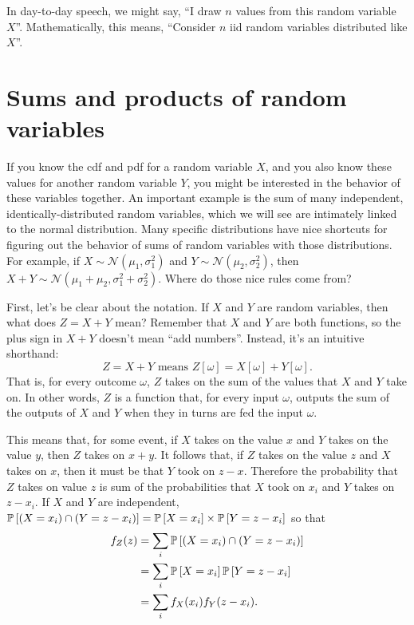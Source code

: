 In day-to-day speech, we might say, ``I draw $n$ values from this random
variable $X$''. Mathematically, this means, ``Consider $n$ iid random
variables distributed like $X$''.


\section{Sums and products of random variables}

If you know the cdf and pdf for a random variable $X$, and you also know these
values for another random variable $Y$, you might be interested in the
behavior of these variables together. An important example is the sum of many
independent, identically-distributed random variables, which we will see are
intimately linked to the normal distribution. Many specific distributions have
nice shortcuts for figuring out the behavior of sums of random variables with
those distributions. For example, if $X \sim \mathcal{N}(\mu_1, \sigma_1^2)$
and $Y \sim \mathcal{N}(\mu_2, \sigma_2^2)$, then $X + Y \sim
\mathcal{N}(\mu_1 + \mu_2, \sigma_1^2 + \sigma_2^2)$. Where do those nice
rules come from?

First, let's be clear about the notation. If $X$ and $Y$ are random variables,
then what does $Z = X + Y$ mean? Remember that $X$ and $Y$ are both functions,
so the plus sign in $X + Y$ doesn't mean ``add numbers''. Instead, it's an intuitive shorthand:
\begin{equation}
Z = X + Y \text{ means } Z[\omega] = X[\omega] + Y[\omega].
\end{equation}
That is, for every outcome $\omega$, $Z$ takes on the sum of the values that
$X$ and $Y$ take on. In other words, $Z$ is a function that, for every input
$\omega$, outputs the sum of the outputs of $X$ and $Y$ when they in turns are
fed the input $\omega$.

This means that, for some event, if $X$ takes on the value $x$ and $Y$ takes
on the value $y$, then $Z$ takes on $x+y$. It follows that, if
$Z$ takes on the value $z$ and $X$ takes on $x$, then it must be that $Y$
took on $z - x$. Therefore the probability that $Z$ takes on value $z$ is
sum of the probabilities that $X$ took on $x_i$ and $Y$ takes on $z - x_i$.
If $X$ and $Y$ are independent,
$\mathbb{P}\left[{(X = x_i) \cap (Y = z - x_i)}\right] = \mathbb{P}\left[{X = x_i}\right] \times \mathbb{P}\left[{Y = z - x_i}\right]$
so that
\begin{align*}
f_Z(z) &= \sum_i \mathbb{P}\left[{(X=x_i) \cap (Y=z - x_i)}\right] \\
  &= \sum_i \mathbb{P}\left[{X=x_i}\right] \mathbb{P}\left[{Y=z-x_i}\right] \\
  &= \sum_i f_X(x_i) f_Y(z - x_i).
\end{align*}

